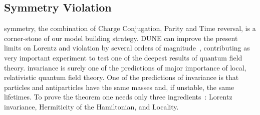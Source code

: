\subsection{ Symmetry Violation}

 symmetry, the combination of Charge Conjugation, Parity and Time reversal, is a corner-stone of our model building strategy. 
DUNE can improve the present limits on Lorentz and  violation by several orders of magnitude~\cite{Streater:1989vi,Barenboim:2002tz,Kostelecky:2003cr,Diaz:2009qk,Kostelecky:2011gq,Barenboim:2017ewj}, contributing as very important experiment to test one of the deepest results of quantum field theory.
%
 invariance is surely one of the predictions of major importance of local, relativistic quantum field theory. One of the predictions of  invariance is that particles and antiparticles have the same masses and, if unstable, the same lifetimes. To prove the  theorem one needs only three ingredients~\cite{Streater:1989vi}: Lorentz invariance, Hermiticity of the Hamiltonian, and Locality.
%

